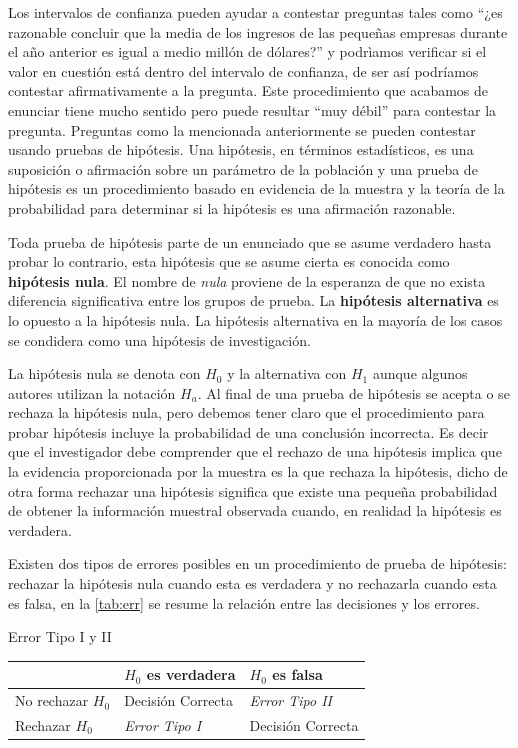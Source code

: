 \documentclass[]{book}
\begin{document}
Los intervalos de confianza pueden ayudar a contestar preguntas tales
como ``¿es razonable concluir que la media de los ingresos de las
pequeñas empresas durante el año anterior es igual a medio millón de
dólares?'' y podrìamos verificar si el valor en cuestión está dentro del
intervalo de confianza, de ser así podríamos contestar afirmativamente a
la pregunta. Este procedimiento que acabamos de enunciar tiene mucho
sentido pero puede resultar ``muy débil'' para contestar la pregunta.
Preguntas como la mencionada anteriormente se pueden contestar usando
pruebas de hipótesis. Una hipótesis, en términos estadísticos, es una
suposición o afirmación sobre un parámetro de la población y una prueba
de hipótesis es un procedimiento basado en evidencia de la muestra y la
teoría de la probabilidad para determinar si la hipótesis es una
afirmación razonable.

Toda prueba de hipótesis parte de un enunciado que se asume verdadero
hasta probar lo contrario, esta hipótesis que se asume cierta es
conocida como \textbf{hipótesis nula}. El nombre de \emph{nula} proviene
de la esperanza de que no exista diferencia significativa entre los
grupos de prueba. La \textbf{hipótesis alternativa} es lo opuesto a la
hipótesis nula. La hipótesis alternativa en la mayoría de los casos se
condidera como una hipótesis de investigación.

La hipótesis nula se denota con \(H_0\) y la alternativa con \(H_1\)
aunque algunos autores utilizan la notación \(H_a\). Al final de una
prueba de hipótesis se acepta o se rechaza la hipótesis nula, pero
debemos tener claro que el procedimiento para probar hipótesis incluye
la probabilidad de una conclusión incorrecta. Es decir que el
investigador debe comprender que el rechazo de una hipótesis implica que
la evidencia proporcionada por la muestra es la que rechaza la
hipótesis, dicho de otra forma rechazar una hipótesis significa que
existe una pequeña probabilidad de obtener la información muestral
observada cuando, en realidad la hipótesis es verdadera.

Existen dos tipos de errores posibles en un procedimiento de prueba de
hipótesis: rechazar la hipótesis nula cuando esta es verdadera y no
rechazarla cuando esta es falsa, en la \ref{tab:err} se resume la
relación entre las decisiones y los errores.

\label{tab:err} Error Tipo I y II

\begin{longtable}[]{@{}lll@{}}
\toprule
& \(H_0\) es verdadera & \(H_0\) es falsa\tabularnewline
\midrule
\endhead
No rechazar \(H_0\) & Decisión Correcta & \emph{Error Tipo
II}\tabularnewline
Rechazar \(H_0\) & \emph{Error Tipo I} & Decisión
Correcta\tabularnewline
\bottomrule
\end{longtable}
\end{document}
